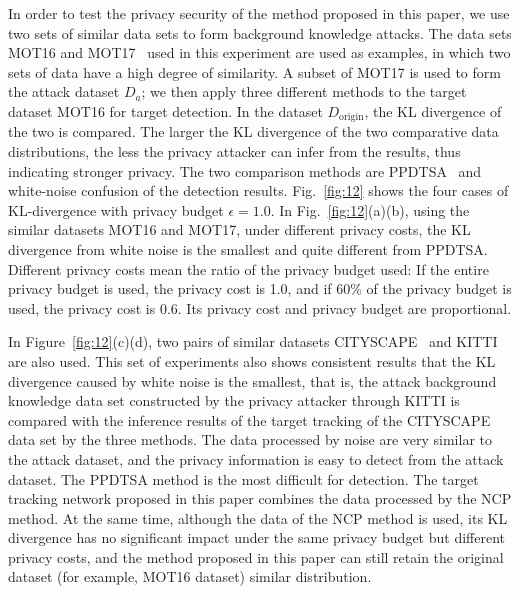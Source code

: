 \documentclass[trans]{IEEEtran}
\begin{document}

In order to test the privacy security of the method proposed in this paper, we use two sets of similar data sets to form background knowledge attacks. The data sets MOT16 and MOT17~\cite{milan2016mot16} used in this experiment are used as examples, in which two sets of data have a high degree of similarity. A subset of MOT17 is used to form the attack dataset $D_a$; we then apply three different methods to the target dataset MOT16 for target detection. In the dataset $D_{\mathrm{origin}}$, the KL divergence of the two is compared. The larger the KL divergence of the two comparative data distributions, the less the privacy attacker can infer from the results, thus indicating stronger privacy. The two comparison methods are PPDTSA~\cite{ma2021ppdtsa} and white-noise confusion of the detection results. Fig.~\ref{fig:12} shows the four cases of KL-divergence with privacy budget $\epsilon = 1.0$. In Fig.~\ref{fig:12}(a)(b), using the similar datasets MOT16 and MOT17, under different privacy costs, the KL divergence from white noise is the smallest and quite different from PPDTSA. Different privacy costs mean the ratio of the privacy budget used: If the entire privacy budget is used, the privacy cost is 1.0, and if 60\% of the privacy budget is used, the privacy cost is 0.6. Its privacy cost and privacy budget are proportional.

In Figure~\ref{fig:12}(c)(d), two pairs of similar datasets CITYSCAPE~\cite{cordts2016cityscapes} and KITTI~\cite{geiger2013vision} are also used. This set of experiments also shows consistent results that the KL divergence caused by white noise is the smallest, that is, the attack background knowledge data set constructed by the privacy attacker through KITTI is compared with the inference results of the target tracking of the CITYSCAPE data set by the three methods. The data processed by noise are very similar to the attack dataset, and the privacy information is easy to detect from the attack dataset. The PPDTSA method is the most difficult for detection. The target tracking network proposed in this paper combines the data processed by the NCP method. At the same time, although the data of the NCP method is used, its KL divergence has no significant impact under the same privacy budget but different privacy costs, and the method proposed in this paper can still retain the original dataset (for example, MOT16 dataset) similar distribution.
	
\end{document}
